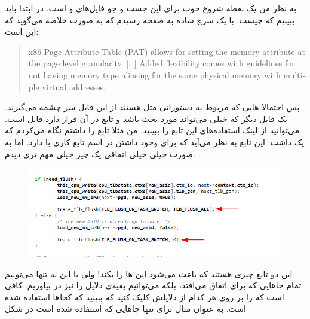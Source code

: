 به نظر من یک نقطه شروع خوب برای این جست و جو فایل‌های
 و 
است. در ابتدا باید ببینیم که
چیست. با یک سرچ ساده به
صفحه رسیدم که به صورت خلاصه می‌گوید که
این است:
\begin{latin}
\begin{quote}
    x86 Page Attribute Table (PAT) allows for setting the memory attribute at the
page level granularity. [\dots]  Added flexibility comes with guidelines for
not having memory type aliasing for the same physical memory with multiple
virtual addresses.
\end{quote}
\end{latin}
پس احتمالا
هایی
که مربوط به دستوراتی مثل
هستند از این فایل سر چشمه می‌گیرند. یک فایل دیگر که خیلی می‌تواند مورد بحث باشد و تابع
در آن قرار دارد فایل
است. می‌توانید از
لینک استفاده‌های این تابع را ببینید. من مثلا تابع
را داشتم نگاه می‌کردم که یک
داشت. این تابع به نظر می‌آید که برای وجود داشتن
در اسم تابع کاری با
دارد. اما به صورت خیلی خیلی اتفاقی یک چیز خیلی مهم تری دیدم:
\begin{figure}[H]
    \centering
    \includegraphics[scale=0.6]{pictures/mysql/results/trace-tlb-flush.png}
\end{figure}
این دو تابع چیزی هستند که باعث می‌شود
این
ها
را
بکند! ولی با این نه تنها می‌تونیم تمام جا‌هایی که
 برای 
اتفاق می‌افتد، بلکه می‌توانیم بقیه‌ی دلایل را نیز در بیاوریم. کافی است که
را بر روی هر کدام از دلایلش کلیک کنید که ببینید که کجا‌ها استفاده شده است. به عنوان مثال برای
تنها جا‌هایی که استفاده شده است در شکل
